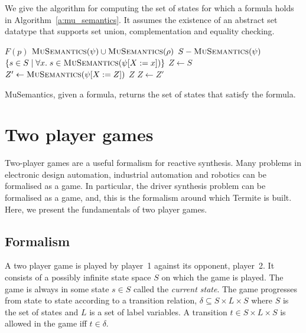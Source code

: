 We give the algorithm for computing the set of states for which a \mucalc formula holds in Algorithm~\ref{a:mu_semantics}. It assumes the existence of an abstract set datatype that supports set union, complementation and equality checking.

\begin{algorithm}
\begin{algorithmic}

        \State\Return $F(p)$
    \ElsIf {$\phi = \psi \vee \rho$}
        \State\Return $\Call{MuSemantics}{\psi} \cup \Call{MuSemantics}{\rho}$
    \ElsIf {$\phi = \neg \psi$}
        \State\Return $S - \Call{MuSemantics}{\psi}$
    \State\Return $\{ s \in S \; | \; \forall x. \; s \in \Call{MuSemantics}{\psi[X:=x]} \}$
        \State $Z \gets S$
        \Loop
            \State $Z' \gets \Call{MuSemantics}{\psi[X:=Z]}$
                \State\Return $Z$
            \EndIf
            \State $Z \gets Z'$
        \EndLoop
    \EndIf
\EndFunction

\end{algorithmic}
\caption{MuSemantics, given a \mucalc formula, returns the set of states that satisfy the formula.}
\label{a:mu_semantics}
\end{algorithm}

\section{Two player games}
\label{sec:two_player}

Two-player games are a useful formalism for reactive synthesis. Many problems in electronic design automation, industrial automation and robotics can be formalised as a game. In particular, the driver synthesis problem can be formalised as a game, and, this is the formalism around which Termite is built. Here, we present the fundamentals of two player games. 

\subsection{Formalism}

A two player game is played by player~1 against its opponent, player~2. It consists of a possibly infinite state space $S$ on which the game is played. The game is always in some state $s \in S$ called the \emph{current state}. The game progresses from state to state according to a transition relation, $\delta \subseteq S \times L \times S$ where $S$ is the set of states and $L$ is a set of label variables. A transition $t \in S \times L \times S$ is allowed in the game iff $t \in \delta$. 

